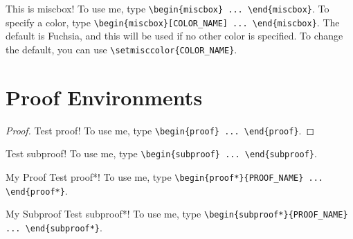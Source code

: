 \documentclass{scrartcl}
\begin{document}
\begin{miscbox}
    This is miscbox! To use me, type \verb#\begin{miscbox} ... \end{miscbox}#. To specify a color, type \verb#\begin{miscbox}[COLOR_NAME] ... \end{miscbox}#. The default is Fuchsia, and this will be used if no other color is specified. To change the default, you can use \verb#\setmisccolor{COLOR_NAME}#.
\end{miscbox}


\newpage

\section{Proof Environments}
\begin{proof}
    Test proof! To use me, type \verb#\begin{proof} ... \end{proof}#.
\end{proof}
\begin{subproof}
    Test subproof! To use me, type \verb#\begin{subproof} ... \end{subproof}#.
\end{subproof}
\begin{proof*}{My Proof}
    Test proof*! To use me, type \verb#\begin{proof*}{PROOF_NAME} ... \end{proof*}#.
\end{proof*}
\begin{subproof*}{My Subproof}
    Test subproof*! To use me, type \verb#\begin{subproof*}{PROOF_NAME} ... \end{subproof*}#.
\end{subproof*}
\end{document}
